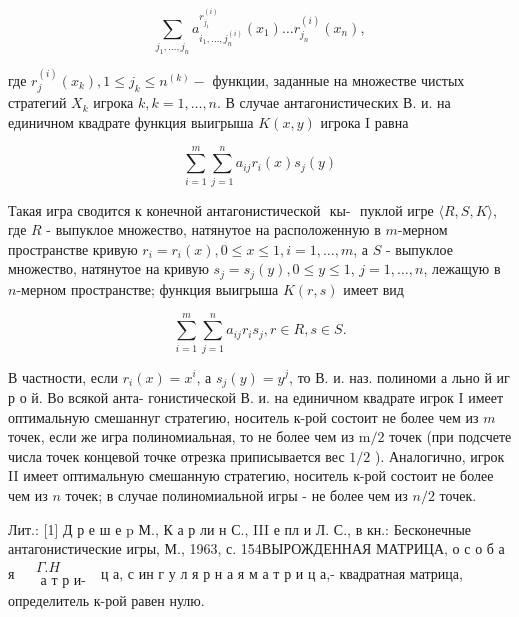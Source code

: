 \documentclass[10pt]{article}
\begin{document}
\[

\sum_{j_{1}, \ldots, j_{n}} a_{i_{1}, \ldots, j_{n}^{(i)}}^{r_{j_{1}}^{(i)}}\left(x_{1}\right) \ldots r_{j_{n}}^{(i)}\left(x_{n}\right),

\]



где $r_{j}^{(i)}\left(x_{k}\right), 1 \leqslant j_{k} \leqslant n^{(k)}-$ функции, заданные на множестве чистых стратегий $X_{k}$ игрока $k, k=1, \ldots, n$. В случае антагонистических В. и. на единичном квадрате функция выигрыша $K(x, y)$ игрока I равна



\[

\sum_{i=1}^{m} \sum_{j=1}^{n} a_{i j} r_{i}(x) s_{j}(y)

\]



Такая игра сводится к конечной антагонистической $\boldsymbol{\text { кы- }}$ пуклой игре $\langle R, S, K\rangle$, где $R$ - выпуклое множество, натянутое на расположенную в $m$-мерном пространстве кривую $r_{i}=r_{i}(x), 0 \leqslant x \leqslant 1, i=1, \ldots, m$, а $S$ - выпуклое множество, натянутое на кривую $s_{j}=s_{j}(y), 0 \leqslant y \leqslant 1$, $j=1, \ldots, n$, лежащую в $n$-мерном пространстве; функция выигрыша $K(r, s)$ имеет вид



\[

\sum_{i=1}^{m} \sum_{j=1}^{n} a_{i j} r_{i} s_{j}, r \in R, s \in S .

\]



В частности, если $r_{i}(x)=x^{i}$, а $s_{j}(y)=y^{j}$, то В. и. наз. полиноми а льно й иг р о й. Во всякой анта- гонистической В. и. на единичном квадрате игрок I имеет оптимальную смешаннуг стратегию, носитель к-рой состоит не более чем из $m$ точек, если же игра полиномиальная, то не более чем из $\mathrm{m} / 2$ точек (при подсчете числа точек концевой точке отрезка приписывается вес $1 / 2$ ). Аналогично, игрок II имеет оптимальную смешанную стратегию, носитель к-рой состоит не более чем из $n$ точек; в случае полиномиальной игры - не более чем из $n / 2$ точек.



Лит.: [1] Д р е ш е $\mathrm{p}$ М., К а р ли н С., III е пл и Л. С., в кн.: Бесконечные антагонистические игры, М., 1963, с. 154ВЫРОЖДЕННАЯ МАТРИЦА, о с о б а я $\begin{aligned} & \Gamma . H \\ & \text { а т р и- }\end{aligned}$ ц а, с ин г у л я р н а я м а т р и ц а,- квадратная матрица, определитель к-рой равен нулю.
\end{document}
